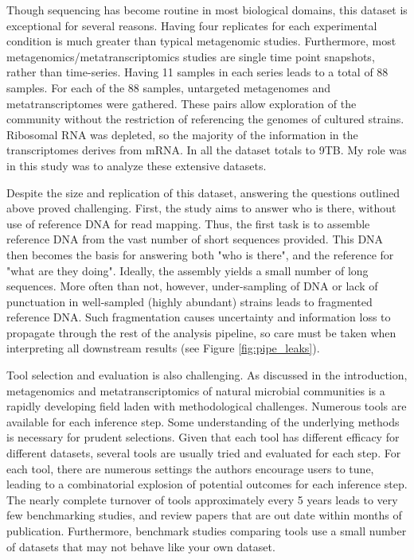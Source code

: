 Though sequencing has become routine in most biological domains, this dataset is exceptional for several reasons.
Having four replicates for each experimental condition is much greater than typical metagenomic studies.
Furthermore, most metagenomics/metatranscriptomics studies are single time point snapshots, rather than time-series.
Having 11 samples in each series leads to a total of 88 samples.
For each of the 88 samples, untargeted metagenomes and metatranscriptomes were gathered.
These pairs allow exploration of the community without the restriction of referencing the genomes of cultured strains.
Ribosomal RNA was depleted, so the majority of the information in the transcriptomes derives from mRNA.
In all the dataset totals to 9TB.
My role was in this study was to analyze these extensive datasets.

Despite the size and replication of this dataset, answering the questions outlined above proved challenging.
First, the study aims to answer who is there, without use of reference DNA for read mapping.  %
Thus, the first task is to assemble reference DNA from the vast number of short sequences provided.
This DNA then becomes the basis for answering both "who is there", and the reference for "what are they doing".
Ideally, the assembly yields a small number of long sequences.
More often than not, however, under-sampling of DNA or lack of punctuation in well-sampled (highly abundant) strains leads to fragmented reference DNA.
Such fragmentation causes uncertainty and information loss to propagate through the rest of the analysis pipeline, so care must be taken when interpreting all downstream results (see Figure \ref{fig:pipe_leaks}).

Tool selection and evaluation is also challenging.
As discussed in the introduction, metagenomics and metatranscriptomics of natural microbial communities is a rapidly developing field laden with methodological challenges.
Numerous tools are available for each inference step.
Some understanding of the underlying methods is necessary for prudent selections.
Given that each tool has different efficacy for different datasets, several tools are usually tried and evaluated for each step.
For each tool, there are numerous settings the authors encourage users to tune, leading to a combinatorial explosion of potential outcomes for each inference step.
The nearly complete turnover of tools approximately every 5 years leads to very few benchmarking studies, and review papers that are out date within months of publication.
Furthermore, benchmark studies comparing tools use a small number of datasets that may not behave like your own dataset.

